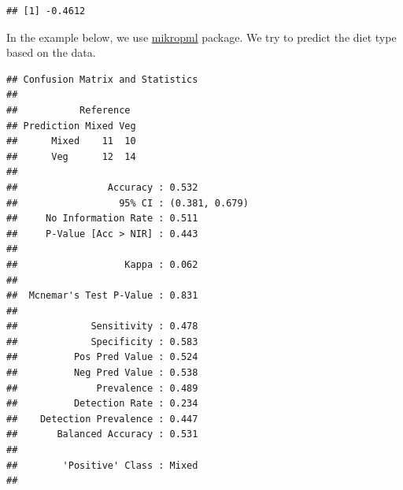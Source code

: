 \documentclass[
]{book}
\newenvironment{Shaded}{\begin{snugshade}}{\end{snugshade}}
\newcommand{\AttributeTok}[1]{\textcolor[rgb]{0.77,0.63,0.00}{#1}}
\newcommand{\CommentTok}[1]{\textcolor[rgb]{0.56,0.35,0.01}{\textit{#1}}}
\newcommand{\DecValTok}[1]{\textcolor[rgb]{0.00,0.00,0.81}{#1}}
\newcommand{\FloatTok}[1]{\textcolor[rgb]{0.00,0.00,0.81}{#1}}
\newcommand{\FunctionTok}[1]{\textcolor[rgb]{0.00,0.00,0.00}{#1}}
\newcommand{\NormalTok}[1]{#1}
\newcommand{\OtherTok}[1]{\textcolor[rgb]{0.56,0.35,0.01}{#1}}
\newcommand{\SpecialCharTok}[1]{\textcolor[rgb]{0.00,0.00,0.00}{#1}}
\newcommand{\StringTok}[1]{\textcolor[rgb]{0.31,0.60,0.02}{#1}}
\begin{document}
\begin{verbatim}
## [1] -0.4612
\end{verbatim}

In the example below, we use \href{https://journals.asm.org/doi/10.1128/mBio.00434-20}{mikropml}
package. We try to predict the diet type based on the data.

\begin{Shaded}
\end{Shaded}

\begin{verbatim}
## Confusion Matrix and Statistics
## 
##           Reference
## Prediction Mixed Veg
##      Mixed    11  10
##      Veg      12  14
##                                         
##                Accuracy : 0.532         
##                  95% CI : (0.381, 0.679)
##     No Information Rate : 0.511         
##     P-Value [Acc > NIR] : 0.443         
##                                         
##                   Kappa : 0.062         
##                                         
##  Mcnemar's Test P-Value : 0.831         
##                                         
##             Sensitivity : 0.478         
##             Specificity : 0.583         
##          Pos Pred Value : 0.524         
##          Neg Pred Value : 0.538         
##              Prevalence : 0.489         
##          Detection Rate : 0.234         
##    Detection Prevalence : 0.447         
##       Balanced Accuracy : 0.531         
##                                         
##        'Positive' Class : Mixed         
## 
\end{verbatim}
\end{document}
